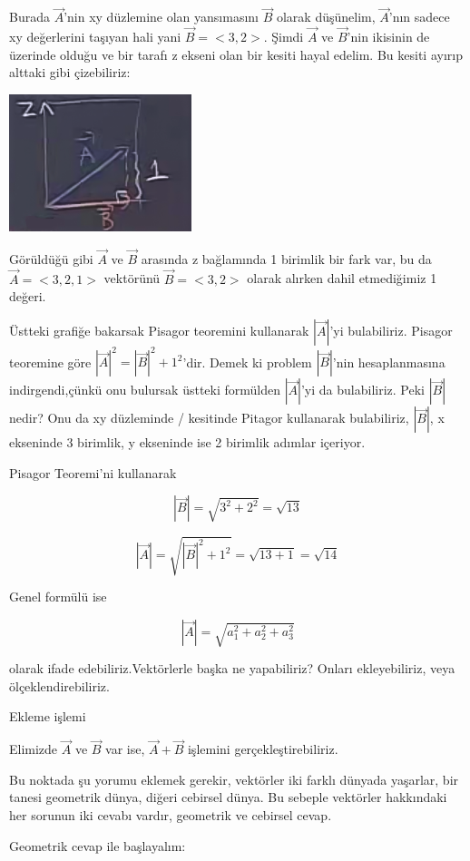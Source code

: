 \documentclass[12pt,fleqn]{article}\usepackage{../../common}
\begin{document}
Burada $\vec{A}$'nin xy düzlemine olan yansımasını $\vec{B}$ olarak düşünelim,
$\vec{A}$'nın sadece xy değerlerini taşıyan hali yani $\vec{B} = <3,2>$.  Şimdi
$\vec{A}$ ve $\vec{B}$'nin ikisinin de üzerinde olduğu ve bir tarafı z ekseni
olan bir kesiti hayal edelim. Bu kesiti ayırıp alttaki gibi çizebiliriz:

\includegraphics[height=4cm]{1_5.png}

Görüldüğü gibi $\vec{A}$ ve $\vec{B}$ arasında z bağlamında 1 birimlik bir fark
var, bu da $\vec{A} = <3,2,1>$ vektörünü $\vec{B}=<3,2>$ olarak alırken dahil
etmediğimiz 1 değeri.

Üstteki grafiğe bakarsak Pisagor teoremini kullanarak $|\vec{A}|$'yi
bulabiliriz. Pisagor teoremine göre $|\vec{A}|^2 = |\vec{B}|^2 + 1^2$'dir. Demek
ki problem $|\vec{B}|$'nin hesaplanmasına indirgendi,çünkü onu bulursak üstteki
formülden $|\vec{A}|$'yi da bulabiliriz. Peki $|\vec{B}|$ nedir? Onu da xy
düzleminde / kesitinde Pitagor kullanarak bulabiliriz, $|\vec{B}|$, x ekseninde
3 birimlik, y ekseninde ise 2 birimlik adımlar içeriyor.

Pisagor Teoremi'ni kullanarak

$$  |\vec{B}| = \sqrt{3^2 + 2^2} = \sqrt{13} $$

$$ |\vec{A}| = \sqrt{|\vec{B}|^2 + 1^2} = \sqrt{13 + 1} = \sqrt{14} $$

Genel formülü ise

$$ |\vec{A}| = \sqrt{a_1 ^2 + a_2^2 + a_3^2} $$

olarak ifade edebiliriz.Vektörlerle başka ne yapabiliriz? Onları ekleyebiliriz, 
veya ölçeklendirebiliriz. 

Ekleme işlemi

Elimizde $\vec{A}$ ve $\vec{B}$ var ise, $\vec{A} + \vec{B}$ 
işlemini gerçekleştirebiliriz. 

Bu noktada şu yorumu eklemek gerekir, vektörler iki farklı dünyada
yaşarlar, bir tanesi geometrik dünya, diğeri cebirsel dünya. Bu sebeple 
vektörler hakkındaki her sorunun iki
cevabı vardır, geometrik ve cebirsel cevap.

Geometrik cevap ile başlayalım: 
\end{document}

